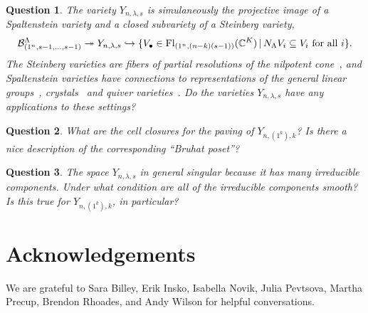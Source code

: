\documentclass[12pt]{amsart}
\newcommand{\st}{\,|\,}
\newcommand{\Fl}{\mathrm{Fl}}
\newcommand{\la}{\lambda}
\newtheorem{question}{Question}
\begin{document}
\begin{question}
  The variety $Y_{n,\la,s}$ is simulaneously the projective image of a Spaltenstein variety and a closed subvariety of a Steinberg variety,
  \[
\cB_{(1^n,s-1,\dots,s-1)}^\Lambda \twoheadrightarrow Y_{n,\la,s}\hookrightarrow \{V_\bullet\in \Fl_{(1^n,(n-k)(s-1))}(\bC^K) \st N_\Lambda V_i\subseteq V_i \text{ for all }i\}.
\]
The Steinberg varieties are fibers of partial resolutions of the nilpotent cone~\cite{Goresky-Macpherson}, and Spaltenstein varieties have connections to representations of the general linear groups~\cite{Braverman-Gaitsgory}, crystals~\cite{Malik} and quiver varieties~\cite{Nakajima1,Nakajima2}. Do the varieties $Y_{n,\la,s}$ have any applications to these settings?
\end{question}


\begin{question}
What are the cell closures for the paving of $Y_{n,(1^k),k}$? Is there a nice description of the corresponding ``Bruhat poset''?
\end{question}


 
 
 \begin{question}
 The space $Y_{n,\la,s}$ in general singular because it has many irreducible components. Under what condition are all of the irreducible components smooth? Is this true for $Y_{n,(1^k),k}$, in particular?
\end{question}




\section{Acknowledgements}

We are grateful to Sara Billey, Erik Insko, Isabella Novik, Julia Pevtsova, Martha Precup, Brendon Rhoades, and Andy Wilson for helpful conversations.




\end{document}
